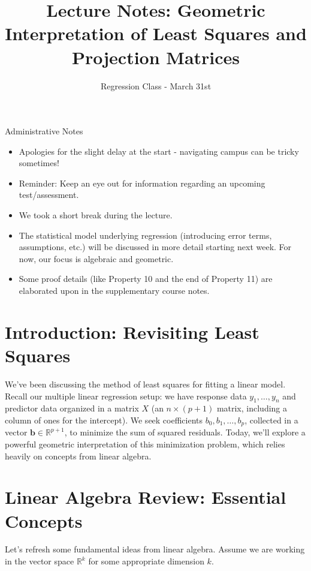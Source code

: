 \documentclass[11pt]{article}
\title{Lecture Notes: Geometric Interpretation of Least Squares and Projection Matrices}
\author{Regression Class - March 31st} %
\date{} %
\theoremstyle{definition}
\newcommand{\vect}[1]{\mathbf{#1}} %
\begin{document}
\maketitle

\begin{adminnote}{Administrative Notes}
\begin{itemize}
    \item Apologies for the slight delay at the start - navigating campus can be tricky sometimes!
    \item Reminder: Keep an eye out for information regarding an upcoming test/assessment.
    \item We took a short break during the lecture.
    \item The statistical model underlying regression (introducing error terms, assumptions, etc.) will be discussed in more detail starting next week. For now, our focus is algebraic and geometric.
    \item Some proof details (like Property 10 and the end of Property 11) are elaborated upon in the supplementary course notes.
\end{itemize}
\end{adminnote}


\section{Introduction: Revisiting Least Squares}

We've been discussing the method of least squares for fitting a linear model. Recall our multiple linear regression setup: we have response data $y_1, \dots, y_n$ and predictor data organized in a matrix $X$ (an $n \times (p+1)$ matrix, including a column of ones for the intercept). We seek coefficients $b_0, b_1, \dots, b_p$, collected in a vector $\vect{b} \in \mathbb{R}^{p+1}$, to minimize the sum of squared residuals. Today, we'll explore a powerful geometric interpretation of this minimization problem, which relies heavily on concepts from linear algebra.

\section{Linear Algebra Review: Essential Concepts}

Let's refresh some fundamental ideas from linear algebra. Assume we are working in the vector space $\mathbb{R}^k$ for some appropriate dimension $k$.
\end{document}
